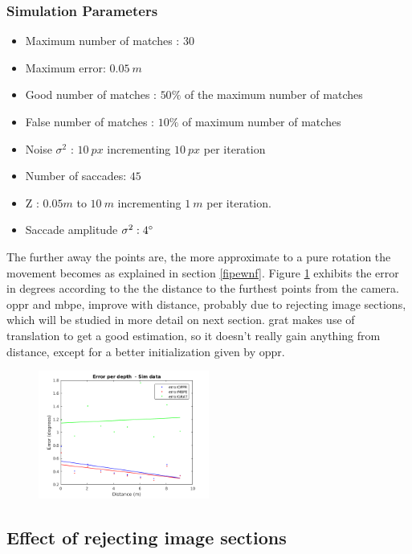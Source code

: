 \subsubsection{Simulation Parameters}
\begin{itemize}
	\item Maximum number of matches : $30$
	\item Maximum error: $0.05 \ m$
	\item Good number of matches : $50 \%$ of the maximum number of matches
	\item False number of matches : $10 \%$ of maximum number of matches
	\item Noise $\sigma^2$ : $10 \ px$ incrementing $10 \ px$ per iteration
	\item Number of saccades: $45$
	\item Z : $0.05 m$ to $10 \ m$ incrementing $1 \ m$ per iteration.
	\item Saccade amplitude $\sigma^2 : 4 \degree $
\end{itemize}
The further away the points are, the more approximate to a pure rotation the movement becomes as explained in section \ref{fipewnf}.
Figure \ref{cha5:sec1:depthh} exhibits the error in degrees according to the the distance to the furthest points from the camera. \acrshort{oppr} and \acrshort{mbpe}, improve with distance, probably due to rejecting image sections, which will be studied in more detail on next section. \acrshort{grat} makes use of translation to get a good estimation, so it doesn't really gain anything from distance, except for a better initialization given by \acrshort{oppr}.
\begin{figure}[ht]
	\centering
	\includegraphics[width=0.5\textwidth]{images/sim/depthh.png}
	\label{cha5:sec1:depthh}
\end{figure}	

\subsection{Effect of rejecting image sections}

